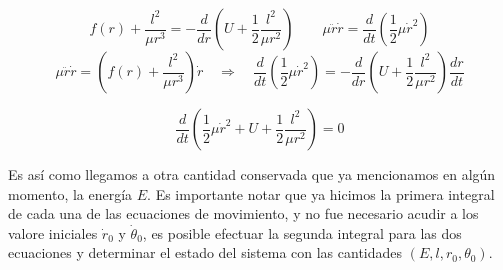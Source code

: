	\[
	f(r)+\frac{l^2}{\mu r^3}=-\frac{d}{dr}\left(U+\frac{1}{2}\frac{l^2}{\mu r^2}\right)\quad\quad\mu\ddot{r}\dot{r}=\frac{d}{dt}\left(\frac{1}{2}\mu\dot{r}^2\right)
	\]
	\[
	\mu\ddot{r}\dot{r}=\left(f(r)+\frac{l^2}{\mu r^3}\right)\dot{r}\quad\Longrightarrow\quad\frac{d}{dt}\left(\frac{1}{2}\mu\dot{r}^2\right)=-\frac{d}{dr}\left(U+\frac{1}{2}\frac{l^2}{\mu r^2}\right)\frac{dr}{dt}
	\]
	
	\[
	\frac{d}{dt}\left(\frac{1}{2}\mu\dot{r}^2+U+\frac{1}{2}\frac{l^2}{\mu r^2}\right)=0
	\]
	
	Es así como llegamos a otra cantidad conservada que ya mencionamos en algún momento, la energía $E$. Es importante notar que ya hicimos la primera integral de cada una de las ecuaciones de movimiento, y no fue necesario acudir a los valore iniciales $\dot{r}_0$ y $\dot{\theta}_0$, es posible efectuar la segunda integral para las dos ecuaciones y determinar el estado del sistema con las cantidades $(E,l,r_0,\theta_0)$.
